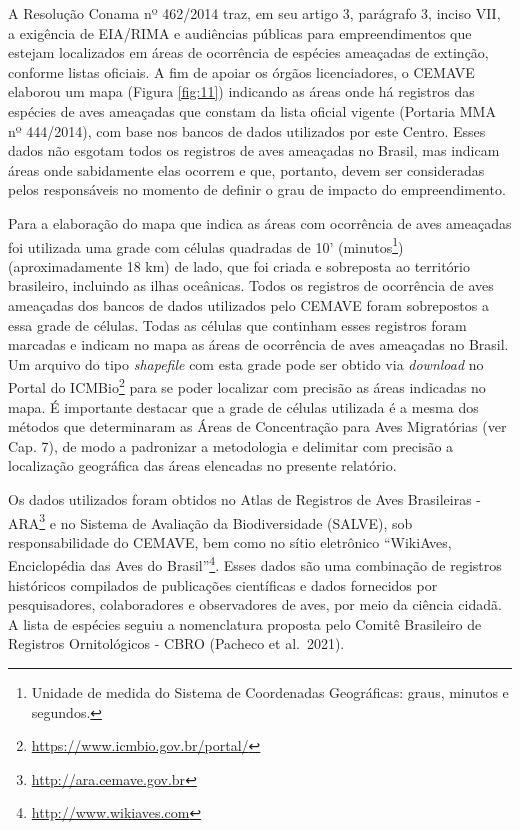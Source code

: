 \documentclass[
  oneside]{scrbook}
\DeclareRobustCommand{\href}[2]{#2\footnote{\url{#1}}}
\begin{document}
A Resolução Conama nº 462/2014 traz, em seu artigo 3, parágrafo 3, inciso VII, a exigência de EIA/RIMA e audiências públicas para empreendimentos que estejam localizados em áreas de ocorrência de espécies ameaçadas de extinção, conforme listas oficiais. A fim de apoiar os órgãos licenciadores, o CEMAVE elaborou um mapa (Figura \ref{fig:11}) indicando as áreas onde há registros das espécies de aves ameaçadas que constam da lista oficial vigente (Portaria MMA nº 444/2014), com base nos bancos de dados utilizados por este Centro. Esses dados não esgotam todos os registros de aves ameaçadas no Brasil, mas indicam áreas onde sabidamente elas ocorrem e que, portanto, devem ser consideradas pelos responsáveis no momento de definir o grau de impacto do empreendimento.

Para a elaboração do mapa que indica as áreas com ocorrência de aves ameaçadas foi utilizada uma grade com células quadradas de 10' (minutos\footnote{Unidade de medida do Sistema de Coordenadas Geográficas: graus, minutos e segundos.}) (aproximadamente 18 km) de lado, que foi criada e sobreposta ao território brasileiro, incluindo as ilhas oceânicas. Todos os registros de ocorrência de aves ameaçadas dos bancos de dados utilizados pelo CEMAVE foram sobrepostos a essa grade de células. Todas as células que continham esses registros foram marcadas e indicam no mapa as áreas de ocorrência de aves ameaçadas no Brasil. Um arquivo do tipo \emph{shapefile} com esta grade pode ser obtido via \emph{download} no \href{https://www.icmbio.gov.br/portal/}{Portal do ICMBio} para se poder localizar com precisão as áreas indicadas no mapa. É importante destacar que a grade de células utilizada é a mesma dos métodos que determinaram as Áreas de Concentração para Aves Migratórias (ver Cap. 7), de modo a padronizar a metodologia e delimitar com precisão a localização geográfica das áreas elencadas no presente relatório.

Os dados utilizados foram obtidos no \href{http://ara.cemave.gov.br}{Atlas de Registros de Aves Brasileiras - ARA} e no Sistema de Avaliação da Biodiversidade (SALVE), sob responsabilidade do CEMAVE, bem como no sítio eletrônico \href{http://www.wikiaves.com}{``WikiAves, Enciclopédia das Aves do Brasil''}. Esses dados são uma combinação de registros históricos compilados de publicações científicas e dados fornecidos por pesquisadores, colaboradores e observadores de aves, por meio da ciência cidadã. A lista de espécies seguiu a nomenclatura proposta pelo Comitê Brasileiro de Registros Ornitológicos - CBRO (Pacheco et al.~2021).
\end{document}

